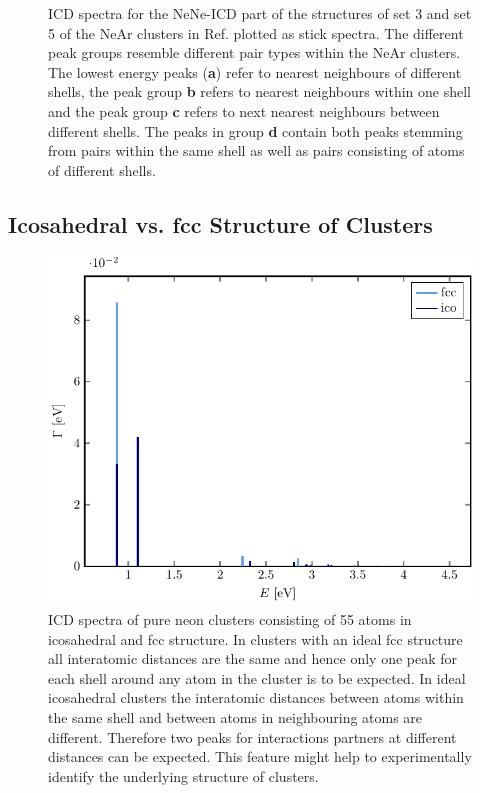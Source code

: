 \begin{figure}[h]
 \caption{ICD spectra for the NeNe-ICD part of the structures of set 3 and
          set 5 of the NeAr clusters in Ref. \cite{Fasshauer14_1}
          plotted as stick spectra.
          The different peak groups resemble different pair types
          within the NeAr clusters. The lowest energy peaks (\textbf{a})
          refer to nearest neighbours
          of different shells, the peak group \textbf{b} refers
          to nearest neighbours within one shell and the peak group \textbf{c}
          refers to next nearest neighbours between different shells.
          The peaks in group \textbf{d} contain both peaks stemming from
          pairs within the same shell as well as pairs consisting of atoms
          of different shells.}
 \label{figure:rot}
\end{figure}


\subsection{Icosahedral vs. fcc Structure of Clusters}
\label{sec:icofcc}
\begin{figure}[h]
 \centering
 \includegraphics[width=\columnwidth]{pics/reinNe}
 \caption{ICD spectra of pure neon clusters consisting of 55 atoms in
          icosahedral and fcc structure. In clusters with an ideal fcc structure
          all interatomic distances are the same and hence only one peak
          for each shell around any atom in the cluster is to be expected.
          In ideal icosahedral clusters the interatomic distances between atoms
          within the same shell and between atoms in neighbouring atoms
          are different. Therefore two peaks for interactions partners
          at different distances can be expected. This feature might
          help to experimentally identify the underlying structure of clusters.}
 \label{figure:reinNe}
\end{figure}
